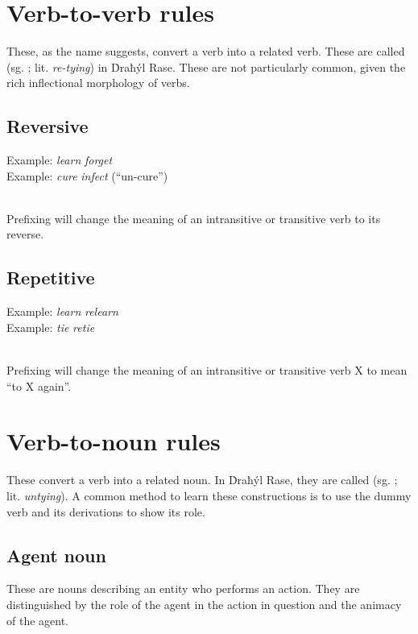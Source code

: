 \documentclass{book}
\begin{document}
\section{Verb-to-verb rules}

These, as the name suggests, convert a verb into a related verb. These are called  (sg. ; lit. \emph{re-tying}) in Ḋraħýl Rase. These are not particularly common, given the rich inflectional morphology of verbs.

\subsection{Reversive}

Example:  \emph{learn} \ra{}  \emph{forget} \\
Example:  \emph{cure} \ra{}  \emph{infect} (``un-cure'') \\
~

Prefixing  will change the meaning of an intransitive or transitive verb to its reverse.

\subsection{Repetitive}

Example:  \emph{learn} \ra{}  \emph{relearn} \\
Example:  \emph{tie} \ra{}  \emph{retie} \\
~

Prefixing  will change the meaning of an intransitive or transitive verb X to mean ``to X again''.

\section{Verb-to-noun rules}

These convert a verb into a related noun. In Ḋraħýl Rase, they are called  (sg. ; lit. \emph{untying}). A common method to learn these constructions is to use the dummy verb  and its derivations to show its role.

\subsection{Agent noun}

These are nouns describing an entity who performs an action. They are distinguished by the role of the agent in the action in question and the animacy of the agent.
\end{document}
